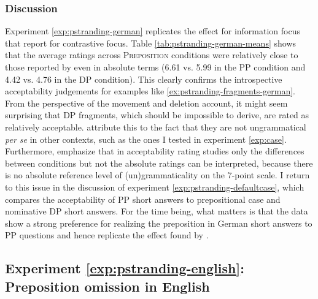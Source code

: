 \subsubsection{Discussion}
Experiment \ref{exp:pstranding-german} replicates the effect for information focus that \citet{merchant.etal2013} report for contrastive focus. Table \ref{tab:pstranding-german-means} shows that the average ratings across \textsc{Preposition} conditions were relatively close to those reported by \citet{merchant.etal2013} even in absolute terms (6.61 vs. 5.99 in the PP condition and 4.42 vs. 4.76 in the DP condition). This clearly confirms the introspective acceptability judgements for examples like \ref{ex:pstranding-fragments-german}. From the perspective of the movement and deletion account, it might seem surprising that DP fragments, which should be impossible to derive, are rated as relatively acceptable. \citet{merchant.etal2013} attribute this to the fact that they are not ungrammatical \textit{per se} in other contexts, such as the ones I tested in experiment \ref{exp:case}. Furthermore, \citet{merchant.etal2013} emphasize that in acceptability rating studies only the differences between conditions but not the absolute ratings can be interpreted, because there is no absolute reference level of (un)grammaticality on the 7-point scale. 
I return to this issue in the discussion of experiment \ref{exp:pstranding-defaultcase}, which compares the acceptability of PP short answers to prepositional case and nominative DP short answers. For the time being, what matters is that the data show a strong preference for realizing the preposition in German short answers to PP questions and hence replicate the effect found by \citet{merchant.etal2013}.

\label{exp:pstranding-english}
\subsection{Experiment \ref{exp:pstranding-english}: Preposition omission in English} \label{sec:pstranding-english}

